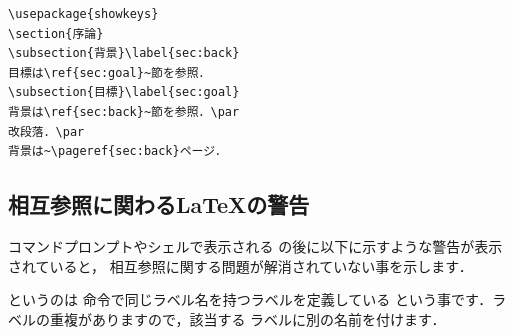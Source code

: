 \begin{small}
\begin{verbatim}
\usepackage{showkeys}
\section{序論}
\subsection{背景}\label{sec:back}
目標は\ref{sec:goal}~節を参照．
\subsection{目標}\label{sec:goal}
背景は\ref{sec:back}~節を参照．\par
改段落．\par
背景は~\pageref{sec:back}ページ．
\end{verbatim}
\end{small}\IOlabel

\subsection{相互参照に関わる\LaTeX の警告}
%
%
%
%
コマンドプロンプトやシェルで表示される
の後に以下に示すような警告が表示されていると，
相互参照に関する問題が解消されていない事を示します．
\par{}
というのは 命令で同じラベル名を持つラベルを定義している
という事です．ラベルの重複がありますので，該当する
ラベルに別の名前を付けます．

